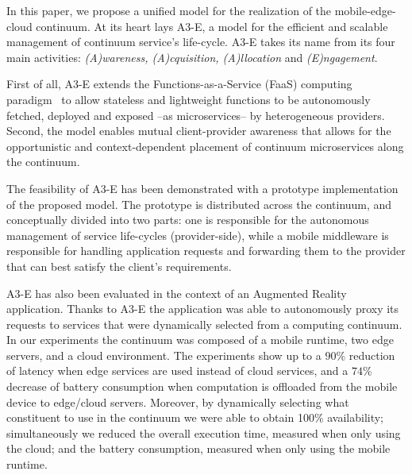 In this paper, we propose a unified model for the realization of the mobile-edge-cloud continuum. At its heart lays A3-E, a model for the efficient and scalable management of continuum service's life-cycle. A3-E takes its name from its four main activities: \textit{(A)wareness, (A)cquisition, (A)llocation} and \textit{(E)ngagement}. 

First of all, A3-E extends the Functions-as-a-Service (FaaS) computing paradigm~\cite{Hendrickson:2016,baldini2017serverless,GarrigaMendonca2017} to allow stateless and lightweight functions to be autonomously fetched, deployed and exposed --as microservices-- by heterogeneous providers. Second, the model enables mutual client-provider awareness that allows for the opportunistic and context-dependent placement of continuum microservices along the continuum. 

The feasibility of A3-E has been demonstrated with a prototype implementation of the proposed model. The prototype is distributed across the continuum, and conceptually divided into two parts: one is responsible for the autonomous management of service life-cycles (provider-side), while a mobile middleware is responsible for handling application requests and forwarding them to the provider that can best satisfy the client's requirements.


A3-E has also been evaluated in the context of an Augmented Reality application. Thanks to A3-E the application was able to autonomously proxy its requests to services that were dynamically selected from a computing continuum. In our experiments the continuum was composed of a mobile runtime, two edge servers, and a cloud environment. The experiments show up to a $90$\% reduction of latency when edge services are used instead of cloud services, and a $74$\% decrease of battery consumption when computation is offloaded from the mobile device to edge/cloud servers. Moreover, by dynamically selecting what constituent to use in the continuum we were able to obtain 100\% availability; simultaneously we reduced the overall execution time, measured when only using the cloud; and the battery consumption, measured when only using the mobile runtime.

